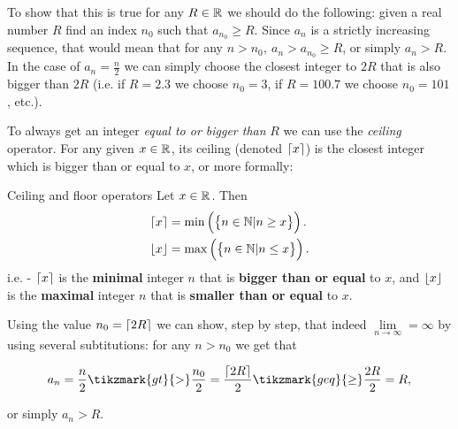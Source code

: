 To show that this is true for any $R\in\mathbb{R}^{}$ we should do the following: given a real number $R$ find an index $n_{0}$ such that $a_{n_{0}}\geq R$. Since $a_{n}$ is a strictly increasing sequence, that would mean that for any $n>n_{0},\ a_{n}>a_{n_{0}}\geq R$, or simply $a_{n}>R$. In the case of $a_{n}=\frac{n}{2}$ we can simply choose the closest integer to $2R$ that is also bigger than $2R$ (i.e. if $R=2.3$ we choose $n_{0}=3$, if $R=100.7$ we choose $n_{0}=101$, etc.).

To always get an integer \textit{equal to or bigger than} $R$ we can use the \emph{ceiling} operator. For any given $x\in\mathbb{R}^{}$, its ceiling (denoted $\lceil x \rceil$) is the closest integer which is bigger than or equal to $x$, or more formally:

\begin{definition}{Ceiling and floor operators}{}
	Let $x\in\mathbb{R}^{}$. Then
	\begin{align}
		\lceil x \rceil &= \min\left(\left\{ n\in\mathbb{N} | n\geq x\right\}\right).\\
		\lfloor x \rfloor &= \max\left(\left\{ n\in\mathbb{N} | n\leq x\right\}\right).
		\label{eq:ceiling}
	\end{align}
	i.e. - $\lceil x \rceil$ is the \textbf{minimal} integer $n$ that is \textbf{bigger than or equal} to $x$, and $\lfloor x \rfloor$ is the \textbf{maximal} integer $n$ that is \textbf{smaller than or equal} to $x$.
\end{definition}

Using the value $n_{0}=\lceil 2R \rceil$ we can show, step by step, that indeed $\lim\limits_{n\to\infty}=\infty$ by using several subtitutions: for any $n>n_{0}$ we get that

\vspace{1em}
\[
	a_{n} = \frac{n}{2} \tikzmark{gt}{>} \frac{n_{0}}{2} = \frac{\ceil{2R}}{2} \tikzmark{geq}{\geq}\frac{2R}{2} = R,
\]

\vspace{2em}
or simply $a_{n}>R$.

